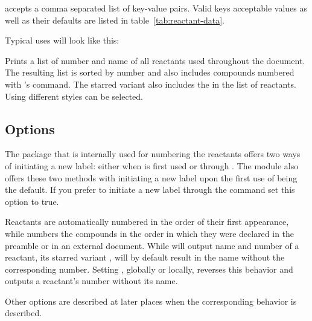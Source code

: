 \documentclass{chemmacros-manual}
\begin{document}
 accepts a comma separated list of key-value pairs. Valid keys
acceptable values as well as their defaults are listed in table~\vref{tab:reactant-data}.

Typical uses will look like this:
\begin{sourcecode}
\end{sourcecode}

\begin{commands}
   Prints a list of number and name of all reactants used
   throughout the document. The resulting list is sorted by number and also includes
   compounds numbered with 's  command. The starred variant 
   also includes the  in the list of reactants. Using  
   different styles can be selected.
\end{commands}

\subsection{Options}
\begin{options}
    The  package that is internally used for numbering the
    reactants offers two ways of initiating a new label: either when 
    is first used or through .  The  module
    also offers these two methods with initiating a new label upon the first
    use of  being the default.   If you prefer to initiate a
    new label through the  command set this option to
    true.

    Reactants are automatically numbered in the order of their first
    appearance, while  numbers the compounds in the order in
    which they were declared in the preamble or in an external document.
    While  will output name and number of a reactant, its starred variant 
     , will by default result in the name without the corresponding number. 
     Setting , globally or locally, reverses this behavior and outputs
      a reactant's number without its name.
\end{options}
Other options are described at later places when the corresponding behavior is
described.
\end{document}
